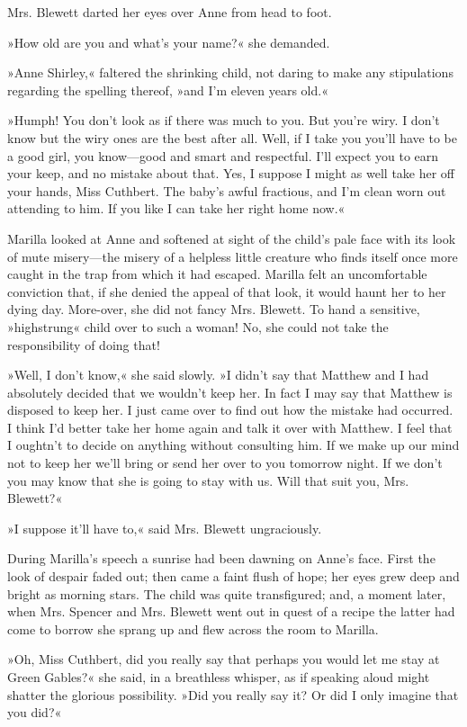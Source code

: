 Mrs. Blewett darted her eyes over Anne from head to foot.

»How old are you and what’s your name?« she demanded.

»Anne Shirley,« faltered the shrinking child, not daring to make any stipulations regarding the spelling thereof, »and I’m eleven years old.«

»Humph! You don’t look as if there was much to you. But you’re wiry. I don’t know but the wiry ones are the best after all. Well, if I take you you’ll have to be a good girl, you know—good and smart and respectful. I’ll expect you to earn your keep, and no mistake about that. Yes, I suppose I might as well take her off your hands, Miss Cuthbert. The baby’s awful fractious, and I’m clean worn out attending to him. If you like I can take her right home now.«

Marilla looked at Anne and softened at sight of the child’s pale face with its look of mute misery—the misery of a helpless little creature who finds itself once more caught in the trap from which it had escaped. Marilla felt an uncomfortable conviction that, if she denied the appeal of that look, it would haunt her to her dying day. More-over, she did not fancy Mrs. Blewett. To hand a sensitive, »highstrung« child over to such a woman! No, she could not take the responsibility of doing that!

»Well, I don’t know,« she said slowly. »I didn’t say that Matthew and I had absolutely decided that we wouldn’t keep her. In fact I may say that Matthew is disposed to keep her. I just came over to find out how the mistake had occurred. I think I’d better take her home again and talk it over with Matthew. I feel that I oughtn’t to decide on anything without consulting him. If we make up our mind not to keep her we’ll bring or send her over to you tomorrow night. If we don’t you may know that she is going to stay with us. Will that suit you, Mrs. Blewett?«

»I suppose it’ll have to,« said Mrs. Blewett ungraciously.

During Marilla’s speech a sunrise had been dawning on Anne’s face. First the look of despair faded out; then came a faint flush of hope; her eyes grew deep and bright as morning stars. The child was quite transfigured; and, a moment later, when Mrs. Spencer and Mrs. Blewett went out in quest of a recipe the latter had come to borrow she sprang up and flew across the room to Marilla.

»Oh, Miss Cuthbert, did you really say that perhaps you would let me stay at Green Gables?« she said, in a breathless whisper, as if speaking aloud might shatter the glorious possibility. »Did you really say it? Or did I only imagine that you did?«

